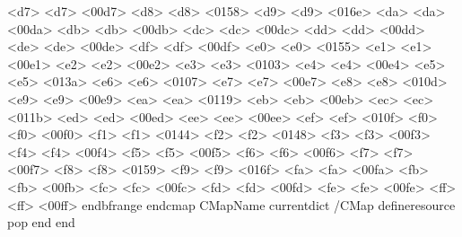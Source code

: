       <d7> <d7> <00d7> %
      <d8> <d8> <0158> %
      <d9> <d9> <016e> %
      <da> <da> <00da> %
      <db> <db> <00db> %
      <dc> <dc> <00dc> %
      <dd> <dd> <00dd> %
      <de> <de> <00de> %
      <df> <df> <00df> %
      <e0> <e0> <0155> %
      <e1> <e1> <00e1> %
      <e2> <e2> <00e2> %
      <e3> <e3> <0103> %
      <e4> <e4> <00e4> %
      <e5> <e5> <013a> %
      <e6> <e6> <0107> %
      <e7> <e7> <00e7> %
      <e8> <e8> <010d> %
      <e9> <e9> <00e9> %
      <ea> <ea> <0119> %
      <eb> <eb> <00eb> %
      <ec> <ec> <011b> %
      <ed> <ed> <00ed> %
      <ee> <ee> <00ee> %
      <ef> <ef> <010f> %
      <f0> <f0> <00f0> %
      <f1> <f1> <0144> %
      <f2> <f2> <0148> %
      <f3> <f3> <00f3> %
      <f4> <f4> <00f4> %
      <f5> <f5> <00f5> %
      <f6> <f6> <00f6> %
      <f7> <f7> <00f7> %
      <f8> <f8> <0159> %
      <f9> <f9> <016f> %
      <fa> <fa> <00fa> %
      <fb> <fb> <00fb> %
      <fc> <fc> <00fc> %
      <fd> <fd> <00fd> %
      <fe> <fe> <00fe> %
      <ff> <ff> <00ff> %
    endbfrange
  endcmap
CMapName currentdict /CMap defineresource pop end
end
\stoppdffontresource

\endinput 
